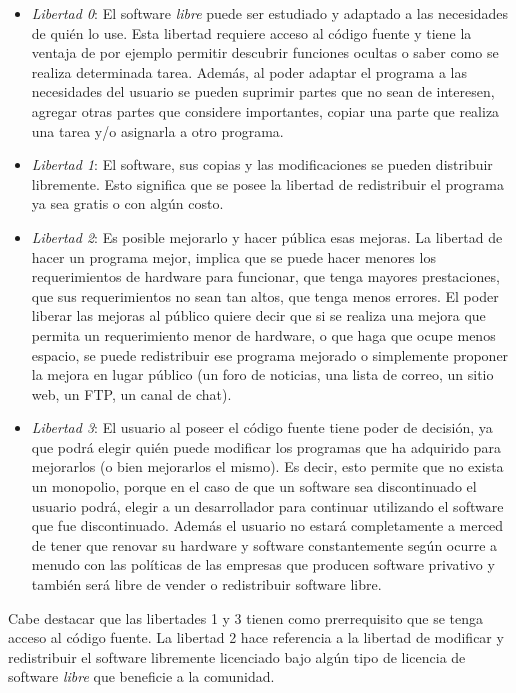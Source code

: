 \begin{itemize}
\item \textit{Libertad 0}: El software \textit{libre} puede ser
  estudiado y adaptado a las necesidades de quién lo use. Esta
  libertad requiere acceso al código fuente y tiene la ventaja de por
  ejemplo permitir descubrir funciones ocultas o saber como se realiza
  determinada tarea. Además, al poder adaptar el programa a las
  necesidades del usuario se pueden suprimir partes que no sean de
  interesen, agregar otras partes que considere importantes, copiar
  una parte que realiza una tarea y/o asignarla a otro programa.
\item \textit{Libertad 1}: El software, sus copias y las
  modificaciones se pueden distribuir libremente. Esto significa que
  se posee la libertad de redistribuir el programa ya sea gratis o con
  algún costo.
\item \textit{Libertad 2}: Es posible mejorarlo y hacer pública esas
  mejoras. La libertad de hacer un programa mejor, implica que se
  puede hacer menores los requerimientos de hardware para funcionar,
  que tenga mayores prestaciones, que sus requerimientos no sean tan
  altos, que tenga menos errores. El poder liberar las mejoras al
  público quiere decir que si se realiza una mejora que permita un
  requerimiento menor de hardware, o que haga que ocupe menos espacio,
  se puede redistribuir ese programa mejorado o simplemente proponer
  la mejora en lugar público (un foro de noticias, una lista de
  correo, un sitio web, un FTP, un canal de chat).
\item \textit{Libertad 3}: El usuario al poseer el código fuente tiene
  poder de decisión, ya que podrá elegir quién puede modificar los
  programas que ha adquirido para mejorarlos (o bien mejorarlos el
  mismo). Es decir, esto permite que no exista un monopolio, porque en
  el caso de que un software sea discontinuado el usuario podrá,
  elegir a un desarrollador para continuar utilizando el software que
  fue discontinuado. Además el usuario no estará completamente a
  merced de tener que renovar su hardware y software constantemente
  según ocurre a menudo con las políticas de las empresas que producen
  software privativo y también será libre de vender o redistribuir
  software libre.
\end{itemize}

Cabe destacar que las libertades 1 y 3 tienen como prerrequisito que
se tenga acceso al código fuente. La libertad 2 hace referencia a la
libertad de modificar y redistribuir el software libremente licenciado
bajo algún tipo de licencia de software \textit{libre} que beneficie a
la comunidad.

